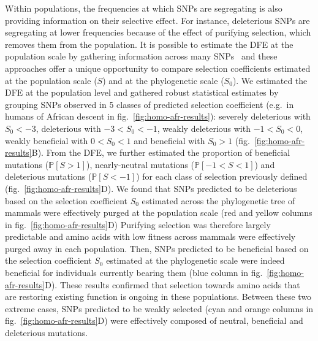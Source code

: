 \documentclass{article}
\newcommand{\proba}{\mathbb{P}}
\newcommand{\Sphy}{S_{0}}
\newcommand{\divStrongDel}{\Sphy < -3}
\newcommand{\divDel}{-3 < \Sphy < -1}
\newcommand{\divWeakDel}{-1 < \Sphy < 0}
\newcommand{\divWeakAdv}{0 < \Sphy < 1}
\newcommand{\divAdv}{ \Sphy > 1}
\newcommand{\Spop}{S}
\newcommand{\polyDel}{\Spop < -1}
\newcommand{\polyNeutral}{-1 < \Spop < 1}
\newcommand{\polyAdv}{ \Spop > 1}
\newcommand{\PpolyDel}{\proba \left[ \polyDel \right]}
\newcommand{\PpolyNeutral}{\proba \left[ \polyNeutral \right]}
\newcommand{\PpolyAdv}{\proba \left[ \polyAdv \right]}
\begin{document}
    Within populations, the frequencies at which SNPs are segregating is also providing information on their selective effect.
    For instance, deleterious SNPs are segregating at lower frequencies because of the effect of purifying selection, which removes them from the population.
    It is possible to estimate the DFE at the population scale by gathering information across many SNPs~\cite{eyre-walker_distribution_2006, eyre-walker_estimating_2009, galtier_adaptive_2016, tataru_inference_2017} and these approaches offer a unique opportunity to compare selection coefficients estimated at the population scale ($\Spop$) and at the phylogenetic scale ($\Sphy$).
    We estimated the DFE at the population level and gathered robust statistical estimates by grouping SNPs observed in 5 classes of predicted selection coefficient (e.g.~in humans of African descent in fig.~\ref{fig:homo-afr-results}): severely deleterious with $\divStrongDel$, deleterious with $\divDel$, weakly deleterious with $\divWeakDel$, weakly beneficial with $\divWeakAdv$ and beneficial with $\divAdv$ (fig.~\ref{fig:homo-afr-results}B).
    From the DFE, we further estimated the proportion of beneficial mutations ($\PpolyAdv$), nearly-neutral mutations ($\PpolyNeutral$) and deleterious mutations ($\PpolyDel$) for each class of selection previously defined (fig.~\ref{fig:homo-afr-results}D).
    We found that SNPs predicted to be deleterious based on the selection coefficient $\Sphy$ estimated across the phylogenetic tree of mammals were effectively purged at the population scale (red and yellow columns in fig.~\ref{fig:homo-afr-results}D)
    Purifying selection was therefore largely predictable and amino acids with low fitness across mammals were effectively purged away in each population.
    Then, SNPs predicted to be beneficial based on the selection coefficient $\Sphy$ estimated at the phylogenetic scale were indeed beneficial for individuals currently bearing them (blue column in fig.~\ref{fig:homo-afr-results}D).
    These results confirmed that selection towards amino acids that are restoring existing function is ongoing in these populations.
    Between these two extreme cases, SNPs predicted to be weakly selected (cyan and orange columns in fig.~\ref{fig:homo-afr-results}D) were effectively composed of neutral, beneficial and deleterious mutations.
\end{document}
